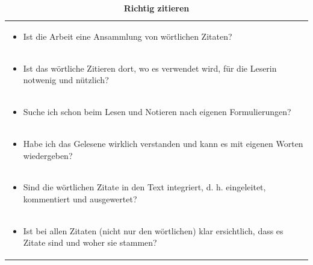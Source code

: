 \documentclass[]{book}
\providecommand{\tightlist}{%
  \setlength{\itemsep}{0pt}\setlength{\parskip}{0pt}}
\theoremstyle{definition}
\theoremstyle{definition}
\theoremstyle{definition}
\theoremstyle{remark}
\begin{document}
\begin{longtable}[]{@{}l@{}}
\caption{\textbf{\label{tab:zitieren} Richtig zitieren}}\tabularnewline
\toprule
\begin{minipage}[t]{0.97\columnwidth}\raggedright\strut
\begin{itemize}
\tightlist
\item
  Ist die Arbeit eine Ansammlung von wörtlichen Zitaten? \vspace{-6mm}
\end{itemize}\strut
\end{minipage}\tabularnewline
\begin{minipage}[t]{0.97\columnwidth}\raggedright\strut
\begin{itemize}
\tightlist
\item
  Ist das wörtliche Zitieren dort, wo es verwendet wird, für die Leserin
  notwenig und nützlich? \vspace{-6mm}
\end{itemize}\strut
\end{minipage}\tabularnewline
\begin{minipage}[t]{0.97\columnwidth}\raggedright\strut
\begin{itemize}
\tightlist
\item
  Suche ich schon beim Lesen und Notieren nach eigenen Formulierungen?
  \vspace{-6mm}
\end{itemize}\strut
\end{minipage}\tabularnewline
\begin{minipage}[t]{0.97\columnwidth}\raggedright\strut
\begin{itemize}
\tightlist
\item
  Habe ich das Gelesene wirklich verstanden und kann es mit eigenen
  Worten wiedergeben? \vspace{-6mm}
\end{itemize}\strut
\end{minipage}\tabularnewline
\begin{minipage}[t]{0.97\columnwidth}\raggedright\strut
\begin{itemize}
\tightlist
\item
  Sind die wörtlichen Zitate in den Text integriert, d. h. eingeleitet,
  kommentiert und ausgewertet? \vspace{-6mm}
\end{itemize}\strut
\end{minipage}\tabularnewline
\begin{minipage}[t]{0.97\columnwidth}\raggedright\strut
\begin{itemize}
\tightlist
\item
  Ist bei allen Zitaten (nicht nur den wörtlichen) klar ersichtlich,
  dass es Zitate sind und woher sie stammen?
\end{itemize}\strut
\end{minipage}\tabularnewline
\bottomrule
\end{longtable}
\end{document}
